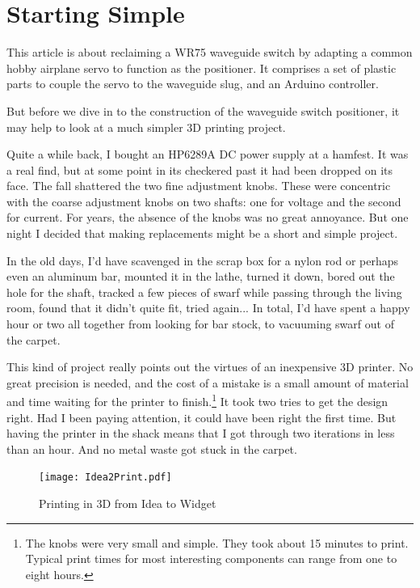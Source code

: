 \documentclass[12pt]{article}
\begin{document}
\section{Starting Simple}

This article is about reclaiming a WR75 waveguide switch by adapting
a common hobby airplane servo to function as the positioner. It comprises
a set of plastic parts to couple the servo to the waveguide slug,
and an Arduino controller.

But before we dive in to the construction of the waveguide switch positioner,
it may help to look at a much simpler 3D printing project.

Quite a while back, I bought an HP6289A DC power supply at a hamfest.
It was a real find, but at some point in its checkered past it had
been dropped on its face.  The fall shattered the two fine adjustment
knobs.  These were concentric with the coarse adjustment knobs on two
shafts: one for voltage and the second for current.  For years, the
absence of the knobs was no great annoyance. But one night I decided
that making replacements might be a short and simple project.

In the old days, I'd have scavenged in the scrap box for a nylon rod
or perhaps even an aluminum bar, mounted it in the lathe, turned it down,
bored out the hole for the shaft, tracked a few pieces of swarf while
passing through the living room, found that it didn't quite fit, tried
again... In total, I'd have spent a happy hour or two all together from
looking for bar stock, to vacuuming swarf out of the carpet.

This kind of project really points out the virtues of an inexpensive
3D printer.  No great precision is needed, and the cost of a mistake
is a small amount of material and time waiting for the
printer to finish.\footnote{The knobs were very small and simple. They
  took about 15 minutes to print. Typical
  print times for most interesting components can range from one to
  eight hours.}
It took two tries to get the design right. Had I
been paying attention, it could have been right the first time.
But having the printer in the shack
means that I got through two iterations in less than an hour.
And no metal waste got stuck in the carpet. 

\begin{figure}[tb]
  \centering
  \texttt{[image: Idea2Print.pdf]}
  \caption{\label{f_3d_process}Printing in 3D from Idea to Widget}
\end{figure}
\end{document}
